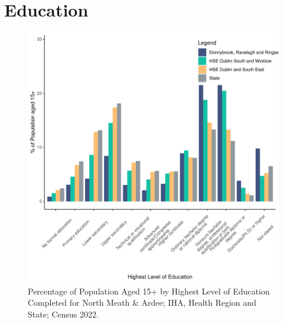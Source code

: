 \documentclass{article}
\begin{document}
\section{Education}\label{sect:Edu}
\begin{figure}[H]
	\centering
	\includegraphics[width = 120mm]{../figures/EduED.pdf}
	\caption{Percentage of Population Aged 15+ by Highest Level of Education Completed for North Meath & Ardee; IHA, Health Region and State; Census 2022.}
	\label{fig:vbnv}
	\end{figure}
\end{document}
